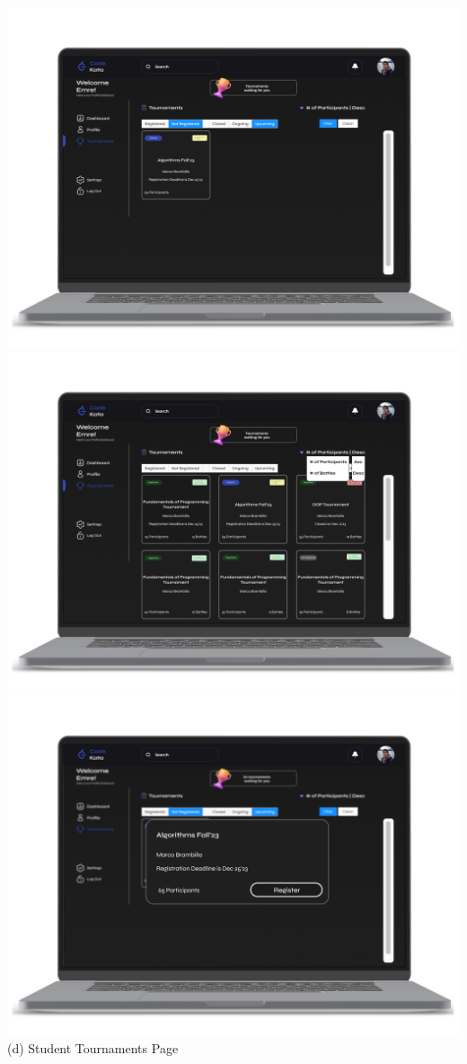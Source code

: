 \begin{center}
    \includegraphics[scale=0.13]{Images/ui-ux/student_tournaments_2.png}    \includegraphics[scale=0.13]{Images/ui-ux/student_tournaments_3.png}    \includegraphics[scale=0.13]{Images/ui-ux/student_tournaments_4.png}
        (d) Student Tournaments Page
\end{center}


